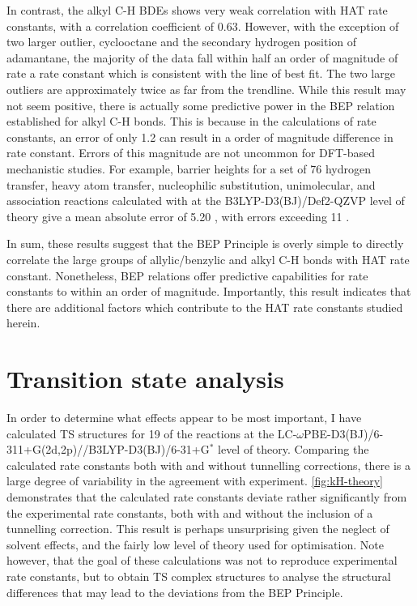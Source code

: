 In contrast, the alkyl C-H BDEs shows very weak correlation with HAT rate constants, with a correlation coefficient of 0.63. However, with the exception of two larger outlier, cyclooctane and the secondary hydrogen position of adamantane, the majority of the data fall within half an order of magnitude of rate a rate constant which is consistent with the line of best fit. The two large outliers are approximately twice as far from the trendline. While this result may not seem positive, there is actually some predictive power in the BEP relation established for alkyl C-H bonds. This is because in the calculations of rate constants, an error of only 1.2 \kcalmol can result in a order of magnitude difference in rate constant. Errors of this magnitude are not uncommon for DFT-based mechanistic studies. For example, barrier heights for a set\cite{Zhao2005,Zhao2009} of 76 hydrogen transfer, heavy atom transfer, nucleophilic substitution, unimolecular, and association reactions calculated with at the B3LYP-D3(BJ)/Def2-QZVP level of theory give a mean absolute error of 5.20 \kcalmol, with errors exceeding 11 \kcalmol.\cite{Goerigk2011}

In sum, these results suggest that the BEP Principle is overly simple to directly correlate the large groups of allylic/benzylic and alkyl C-H bonds with HAT rate constant. Nonetheless, BEP relations offer predictive capabilities for rate constants to within an order of magnitude. Importantly, this result indicates that there are additional factors which contribute to the HAT rate constants studied herein.

\section{Transition state analysis}

In order to determine what effects appear to be most important, I have calculated TS structures for 19 of the reactions at the LC-$\omega$PBE-D3(BJ)/6-311+G(2d,2p)//B3LYP-D3(BJ)/6-31+G$^*$ level of theory. Comparing the calculated rate constants both with and without tunnelling corrections, there is a large degree of variability in the agreement with experiment. \ref{fig:kH-theory} demonstrates that the calculated rate constants deviate rather significantly from the experimental rate constants, both with and without the inclusion of a tunnelling correction. This result is perhaps unsurprising given the neglect of solvent effects, and the fairly low level of theory used for optimisation. Note however, that the goal of these calculations was not to reproduce experimental rate constants, but to obtain TS complex structures to analyse the structural differences that may lead to the deviations from the BEP Principle.

